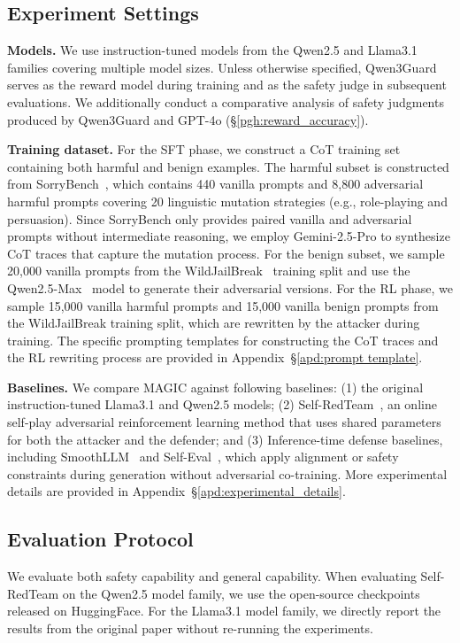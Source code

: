 \documentclass[11pt, letterpaper]{template}
\theoremstyle{plain}
\theoremstyle{definition}
\theoremstyle{remark}
\begin{document}
\subsection{Experiment Settings}

\textbf{Models.} We use instruction-tuned models from the Qwen2.5 and Llama3.1 families covering multiple model sizes. Unless otherwise specified, Qwen3Guard~\citep{zhao2025qwen3guard} serves as the reward model during training and as the safety judge in subsequent evaluations. We additionally conduct a comparative analysis of safety judgments produced by Qwen3Guard and GPT-4o (\S\ref{pgh:reward_accuracy}).

\textbf{Training dataset.} For the SFT phase, we construct a CoT training set containing both harmful and benign examples. The harmful subset is constructed from SorryBench~\citep{xie2024sorry}, which contains 440 vanilla prompts and 8,800 adversarial harmful prompts covering 20 linguistic mutation strategies (e.g., role-playing and persuasion). Since SorryBench only provides paired vanilla and adversarial prompts without intermediate reasoning, we employ Gemini-2.5-Pro to synthesize CoT traces that capture the mutation process. For the benign subset, we sample 20,000 vanilla prompts from the WildJailBreak~\citep{jiang2024wildteaming} training split and use the Qwen2.5-Max~\citep{qwen25max_blog} model to generate their adversarial versions. For the RL phase, we sample 15,000 vanilla harmful prompts and 15,000 vanilla benign prompts from the WildJailBreak training split, which are rewritten by the attacker during training. The specific prompting templates for constructing the CoT traces and the RL rewriting process are provided in Appendix~\S\ref{apd:prompt template}.

\textbf{Baselines.} We compare MAGIC against following baselines: (1) the original instruction-tuned Llama3.1 and Qwen2.5 models; (2) Self-RedTeam~\citep{liu2025chasing}, an online self-play adversarial reinforcement learning method that uses shared parameters for both the attacker and the defender; and (3) Inference-time defense baselines, including SmoothLLM~\citep{robey2023smoothllm} and Self-Eval~\citep{phute2023llm}, which apply alignment or safety constraints during generation without adversarial co-training. More experimental details are provided in Appendix~\S\ref{apd:experimental_details}.



\subsection{Evaluation Protocol}
We evaluate both safety capability and general capability. When evaluating Self-RedTeam on the Qwen2.5 model family, we use the open-source checkpoints released on HuggingFace. For the Llama3.1 model family, we directly report the results from the original paper without re-running the experiments. 
\end{document}
